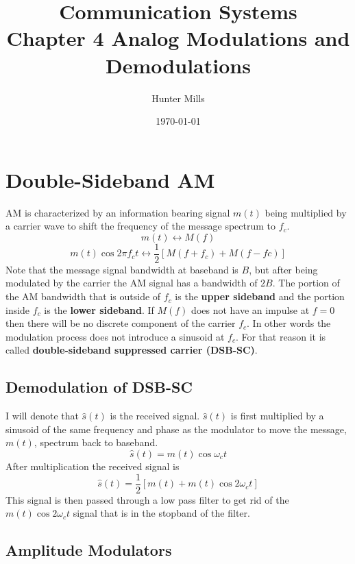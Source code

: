 \documentclass{article}
\title{Communication Systems \\
    \large Chapter 4 Analog Modulations and Demodulations }
\author{Hunter Mills}
\date{\today}
\begin{document}
    \maketitle

    \medskip
    
    \section{Double-Sideband AM}
    AM is characterized by an information bearing signal $m(t)$ being multiplied by a carrier wave to shift the frequency of the message spectrum to $f_c$.
    \begin{equation}
        m(t) \leftrightarrow M(f)
    \end{equation}
    \begin{equation}
        m(t) \cos 2\pi f_ct \leftrightarrow \frac{1}{2}[M(f+f_c) + M(f-fc)]
    \end{equation}
    Note that the message signal bandwidth at baseband is $B$, but after being modulated by the carrier the AM signal has a bandwidth of $2B$. The portion 
    of the AM bandwidth that is outside of $f_c$ is the \textbf{upper sideband} and the portion inside $f_c$ is the \textbf{lower sideband}. If $M(f)$ does
    not have an impulse at $f=0$ then there will be no discrete component of the carrier $f_c$. In other words the modulation process does not introduce
    a sinusoid at $f_c$. For that reason it is called \textbf{double-sideband suppressed carrier (DSB-SC)}.

    \subsection{Demodulation of DSB-SC}
    I will denote that $\hat{s}(t)$ is the received signal. $\hat{s}(t)$ is first multiplied by a sinusoid of the same frequency and phase as the modulator to 
    move the message, $m(t)$, spectrum back to baseband.
    \begin{equation}
        \hat{s}(t) = m(t) \cos \omega_c t
    \end{equation}
    After multiplication the received signal is 
    \begin{equation}
        \hat{s}(t) = \frac{1}{2}[m(t) + m(t)\cos 2\omega_c t]
    \end{equation}
    This signal is then passed through a low pass filter to get rid of the $m(t)\cos2\omega_ct$ signal that is in the stopband of the filter.

    \subsection{Amplitude Modulators}
\end{document}
